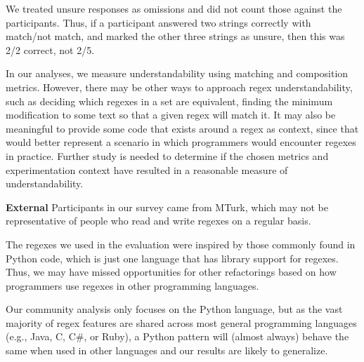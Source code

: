 
We treated unsure responses as omissions and did not count those against the participants. Thus, if a participant answered two strings correctly with match/not match, and marked the other three strings as unsure, then this was 2/2 correct, not 2/5.

In our analyses, we measure understandability using matching and composition metrics. 
However, there may be other ways to approach regex understandability, such as deciding which regexes in a set are equivalent, finding the minimum modification to some text so that a given regex will match it.  
It may also be meaningful to provide some code that exists around a regex as context, since that would better represent a scenario in which programmers would encounter regexes in practice. 
Further study is needed to determine if the chosen metrics and experimentation context have resulted in a reasonable measure of understandability. 

\textbf{External}
Participants in our survey came from MTurk, which may not be representative of people who read and write regexes on a regular basis.

The regexes we used in the evaluation were inspired by those commonly found in Python code, which is just one language that has library support for regexes. Thus, we may have missed opportunities for other refactorings based on how programmers use regexes in other programming languages.

Our community analysis only focuses on the Python language, but as the vast majority of regex features are shared across most general programming languages (e.g., Java, C, C\#, or Ruby), a Python {pattern} will (almost always) behave the same when used in other languages and our results are likely to generalize. 
